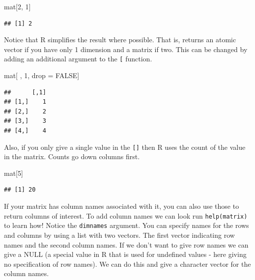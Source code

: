 \documentclass[
]{book}
\newenvironment{Shaded}{\begin{snugshade}}{\end{snugshade}}
\newcommand{\DecValTok}[1]{\textcolor[rgb]{0.00,0.00,0.81}{#1}}
\newcommand{\NormalTok}[1]{#1}
\newcommand{\OtherTok}[1]{\textcolor[rgb]{0.56,0.35,0.01}{#1}}
\newcommand{\StringTok}[1]{\textcolor[rgb]{0.31,0.60,0.02}{#1}}
\theoremstyle{definition}
\theoremstyle{definition}
\theoremstyle{definition}
\theoremstyle{remark}
\begin{document}
\begin{Shaded}
\begin{Highlighting}[]
\NormalTok{mat[}\DecValTok{2}\NormalTok{, }\DecValTok{1}\NormalTok{]}
\end{Highlighting}
\end{Shaded}

\begin{verbatim}
## [1] 2
\end{verbatim}

Notice that R simplifies the result where possible. That is, returns an atomic vector if you have only 1 dimension and a matrix if two. This can be changed by adding an additional argument to the \texttt{{[}} function.

\begin{Shaded}
\begin{Highlighting}[]
\NormalTok{mat[ , }\DecValTok{1}\NormalTok{, drop =}\StringTok{ }\OtherTok{FALSE}\NormalTok{]}
\end{Highlighting}
\end{Shaded}

\begin{verbatim}
##      [,1]
## [1,]    1
## [2,]    2
## [3,]    3
## [4,]    4
\end{verbatim}

Also, if you only give a single value in the \texttt{{[}{]}} then R uses the count of the value in the matrix. Counts go down columns first.

\begin{Shaded}
\begin{Highlighting}[]
\NormalTok{mat[}\DecValTok{5}\NormalTok{]}
\end{Highlighting}
\end{Shaded}

\begin{verbatim}
## [1] 20
\end{verbatim}

If your matrix has column names associated with it, you can also use those to return columns of interest. To add column names we can look run \texttt{help(matrix)} to learn how! Notice the \texttt{dimnames} argument. You can specify names for the rows and columns by using a list with two vectors. The first vector indicating row names and the second column names. If we don't want to give row names we can give a NULL (a special value in R that is used for undefined values - here giving no specification of row names). We can do this and give a character vector for the column names.
\end{document}
